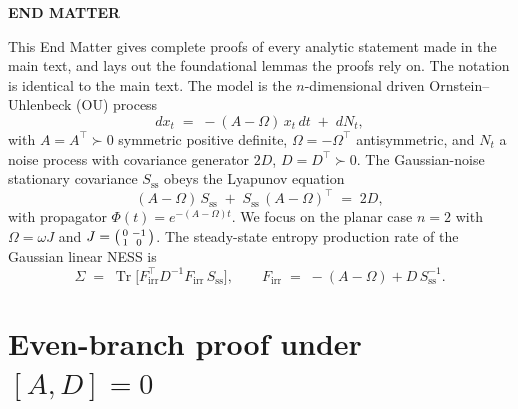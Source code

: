 \documentclass[%
 reprint,
 superscriptaddress,
 nofootinbib,
 nobibnotes,
 amsmath,amssymb,
 aps,
 prl,
 floatfix,
]{revtex4-2}
\newcommand{\Sss}{S_{\mathrm{ss}}}
\newcommand{\Firr}{F_{\mathrm{irr}}}
\newcommand{\Tr}{\operatorname{Tr}}
\begin{document}

\clearpage
\onecolumngrid

\begin{center}
\textbf{\large END MATTER}
\end{center}

\vspace{1em}

\setcounter{section}{0}
\renewcommand{\thesection}{S\arabic{section}}
\setcounter{equation}{0}
\renewcommand{\theequation}{S\arabic{equation}}
\setcounter{figure}{0}
\renewcommand{\thefigure}{S\arabic{figure}}

\noindent This End Matter gives complete proofs of every analytic statement made in the main text, and lays out the foundational lemmas the proofs rely on. The notation is identical to the main text. The model is the $n$-dimensional driven Ornstein--Uhlenbeck (OU) process
\begin{equation}\label{eq:S-OU}
dx_t \;=\; -(A - \Omega)\,x_t\,dt \;+\; dN_t,
\end{equation}
with $A = A^\top \succ 0$ symmetric positive definite, $\Omega = -\Omega^\top$ antisymmetric, and $N_t$ a noise process with covariance generator $2D$, $D = D^\top \succ 0$. The Gaussian-noise stationary covariance $\Sss$ obeys the Lyapunov equation
\begin{equation}\label{eq:S-lyap}
(A - \Omega)\,\Sss \;+\; \Sss\,(A - \Omega)^\top \;=\; 2 D,
\end{equation}
with propagator $\Phi(t) = e^{-(A - \Omega) t}$. We focus on the planar case $n = 2$ with $\Omega = \omega J$ and $J = \begin{psmallmatrix}0 & -1 \\ 1 & 0\end{psmallmatrix}$. The steady-state entropy production rate of the Gaussian linear NESS is
\begin{equation}\label{eq:S-EP-def}
\Sigma \;=\; \Tr\!\bigl[\Firr^\top D^{-1} \Firr\,\Sss\bigr], \qquad
\Firr \;=\; -(A - \Omega) + D\,\Sss^{-1}.
\end{equation}

\section{Even-branch proof under $[A,D]=0$}\label{app:even}
\end{document}
